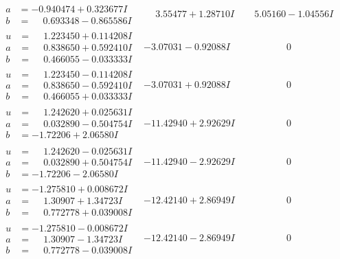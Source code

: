 \documentclass[1p]{elsarticle_modified}
\theoremstyle{definition}
\begin{document}
$$\begin{array}{c|c|c}
\begin{aligned}
a &= -0.940474 + 0.323677 I \\
b &= \phantom{-}0.693348 - 0.865586 I\end{aligned}
 & \phantom{-}3.55477 + 1.28710 I & \phantom{-}5.05160 - 1.04556 I \\ \hline\begin{aligned}
u &= \phantom{-}1.223450 + 0.114208 I \\
a &= \phantom{-}0.838650 + 0.592410 I \\
b &= \phantom{-}0.466055 - 0.033333 I\end{aligned}
 & -3.07031 - 0.92088 I & \phantom{-0.000000 } 0 \\ \hline\begin{aligned}
u &= \phantom{-}1.223450 - 0.114208 I \\
a &= \phantom{-}0.838650 - 0.592410 I \\
b &= \phantom{-}0.466055 + 0.033333 I\end{aligned}
 & -3.07031 + 0.92088 I & \phantom{-0.000000 } 0 \\ \hline\begin{aligned}
u &= \phantom{-}1.242620 + 0.025631 I \\
a &= \phantom{-}0.032890 - 0.504754 I \\
b &= -1.72206 + 2.06580 I\end{aligned}
 & -11.42940 + 2.92629 I & \phantom{-0.000000 } 0 \\ \hline\begin{aligned}
u &= \phantom{-}1.242620 - 0.025631 I \\
a &= \phantom{-}0.032890 + 0.504754 I \\
b &= -1.72206 - 2.06580 I\end{aligned}
 & -11.42940 - 2.92629 I & \phantom{-0.000000 } 0 \\ \hline\begin{aligned}
u &= -1.275810 + 0.008672 I \\
a &= \phantom{-}1.30907 + 1.34723 I \\
b &= \phantom{-}0.772778 + 0.039008 I\end{aligned}
 & -12.42140 + 2.86949 I & \phantom{-0.000000 } 0 \\ \hline\begin{aligned}
u &= -1.275810 - 0.008672 I \\
a &= \phantom{-}1.30907 - 1.34723 I \\
b &= \phantom{-}0.772778 - 0.039008 I\end{aligned}
 & -12.42140 - 2.86949 I & \phantom{-0.000000 } 0 \\ \hline\begin{aligned}

\end{aligned}
\end{array}$$
\end{document}
